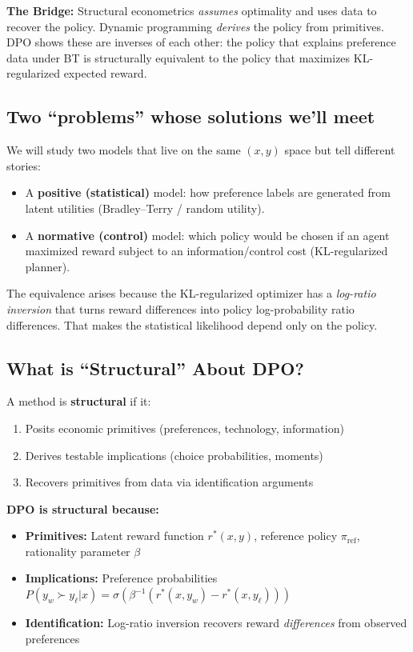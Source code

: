 \documentclass[11pt]{article}
\newcommand{\1}{\mathbf{1}}
\theoremstyle{plain}
\theoremstyle{definition}
\theoremstyle{remark}
\begin{document}
\begin{econintuition}
\textbf{The Bridge:} Structural econometrics \emph{assumes} optimality and uses data to recover the policy. Dynamic programming \emph{derives} the policy from primitives. DPO shows these are inverses of each other: the policy that explains preference data under BT is structurally equivalent to the policy that maximizes KL-regularized expected reward.
\end{econintuition}


\subsection{Two ``problems'' whose solutions we'll meet}
We will study two models that live on the same $(x,y)$ space but tell different stories:
\begin{itemize}
  \item A \textbf{positive (statistical)} model: how preference labels are generated from latent utilities
  (Bradley--Terry / random utility).
  \item A \textbf{normative (control)} model: which policy would be chosen if an agent maximized reward
  subject to an information/control cost (KL-regularized planner).
\end{itemize}
The equivalence arises because the KL-regularized optimizer has a \emph{log-ratio inversion} that turns reward
differences into policy log-probability ratio differences. That makes the statistical likelihood depend only on the policy.

\subsection{What is ``Structural'' About DPO?}

A method is \textbf{structural} if it:
\begin{enumerate}
\item Posits economic primitives (preferences, technology, information)
\item Derives testable implications (choice probabilities, moments)
\item Recovers primitives from data via identification arguments
\end{enumerate}

\noindent \textbf{DPO is structural because:}

\begin{itemize}
\item \textbf{Primitives:} Latent reward function $r^*(x,y)$, reference policy $\pi_{\text{ref}}$, rationality parameter $\beta$
\item \textbf{Implications:} Preference probabilities $P(y_w \succ y_\ell | x) = \sigma(\beta^{-1}(r^*(x,y_w) - r^*(x,y_\ell)))$
\item \textbf{Identification:} Log-ratio inversion recovers reward \emph{differences} from observed preferences
\end{itemize}
\end{document}

